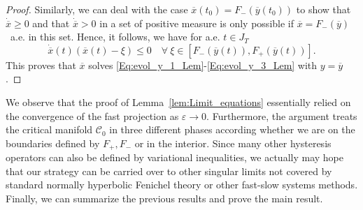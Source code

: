 \documentclass[12pt]{article}
\newcommand{\benn}{\begin{equation*}}
\newcommand{\eenn}{\end{equation*}}
\def\ra{\rightarrow}
\newcommand{\cC}{{\mathcal C}}  %
\begin{document}
\begin{proof}
Similarly, we can deal with the case $\overline{x}(t_0) = F_-(\overline{y}(t_0))$ to 
show that $\dot{\overline{x}}\geq 0$ and that $\dot{\overline{x}}>0$ in a set of positive 
measure is only possible if $\overline{x} = F_-(\overline{y})$~a.e. in this set. Hence,
it follows, we have for a.e. $t\in J_T$ 
\benn
\dot{\overline{x}}(t)(\overline{x}(t)-\xi) \leq 0\quad 
\forall\ \xi\in [F_-(\overline{y}(t)), F_+(\overline{y}(t))].
\eenn
This proves that $\overline{x}$ solves 
\eqref{Eq:evol_y_1_Lem}-\eqref{Eq:evol_y_3_Lem} with $y=\overline{y}$.
\end{proof}

We observe that the proof of Lemma~\ref{lem:Limit_equations} essentially relied on the
convergence of the fast projection as $\varepsilon\ra 0$. Furthermore, the argument treats 
the critical manifold $\cC_0$ in three different phases according whether we are on the 
boundaries defined by $F_+,F_-$ or in the interior. Since many other hysteresis operators 
can also be defined by variational inequalities, we actually may hope that our strategy
can be carried over to other singular limits not covered by standard normally hyperbolic
Fenichel theory or other fast-slow systems methods. Finally, we can summarize the previous
results and prove the main result. 
\end{document}
